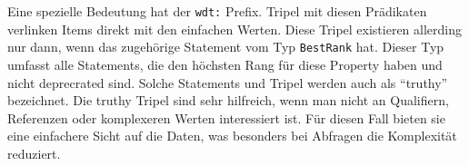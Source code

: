 Eine spezielle Bedeutung hat der \verb|wdt:| Prefix.
Tripel mit diesen Prädikaten verlinken Items direkt mit den einfachen Werten.
Diese Tripel existieren allerding nur dann, wenn das zugehörige Statement vom Typ \verb|BestRank| hat.
Dieser Typ umfasst alle Statements, die den höchsten Rang für diese Property haben und nicht deprecrated sind.
Solche Statements und Tripel werden auch als ``truthy'' bezeichnet.
Die truthy Tripel sind sehr hilfreich, wenn man nicht an Qualifiern, Referenzen oder komplexeren Werten interessiert ist.
Für diesen Fall bieten sie eine einfachere Sicht auf die Daten, was besonders bei Abfragen die Komplexität reduziert.
